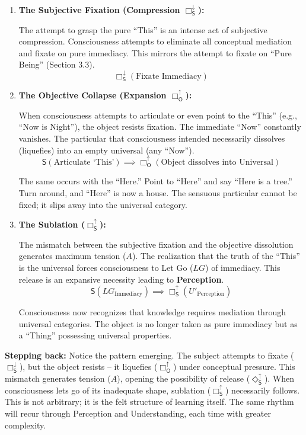 \documentclass[12pt]{book}
\newcommand{\SBoxUp}{\Box_{\mathsf{S}}^{\uparrow}}
\newcommand{\SBoxDown}{\Box_{\mathsf{S}}^{\downarrow}}
\newcommand{\OBoxUp}{\Box_{\mathsf{O}}^{\uparrow}}
\begin{document}
\begin{enumerate}
\item \textbf{The Subjective Fixation (Compression $\SBoxDown$):}

The attempt to grasp the pure ``This'' is an intense act of subjective compression. Consciousness attempts to eliminate all conceptual mediation and fixate on pure immediacy. This mirrors the attempt to fixate on ``Pure Being'' (Section 3.3).
\[
\SBoxDown(\text{Fixate Immediacy})
\]

\item \textbf{The Objective Collapse (Expansion $\OBoxUp$):}

When consciousness attempts to articulate or even point to the ``This'' (e.g., ``Now is Night''), the object resists fixation. The immediate ``Now'' constantly vanishes. The particular that consciousness intended necessarily dissolves (liquefies) into an empty universal (any ``Now'').
\[
\mathsf{S}(\text{Articulate `This'}) \implies \OBoxUp(\text{Object dissolves into Universal})
\]

The same occurs with the ``Here.'' Point to ``Here'' and say ``Here is a tree.'' Turn around, and ``Here'' is now a house. The sensuous particular cannot be fixed; it slips away into the universal category.

\item \textbf{The Sublation ($\SBoxUp$):}

The mismatch between the subjective fixation and the objective dissolution generates maximum tension ($A$). The realization that the truth of the ``This'' is the universal forces consciousness to Let Go ($LG$) of immediacy. This release is an expansive necessity leading to \textbf{Perception}.
\[
\mathsf{S}(LG_{\text{Immediacy}}) \implies \SBoxUp(U'_{\text{Perception}})
\]

Consciousness now recognizes that knowledge requires mediation through universal categories. The object is no longer taken as pure immediacy but as a ``Thing'' possessing universal properties.
\end{enumerate}

\textbf{Stepping back:} Notice the pattern emerging. The subject attempts to fixate ($\Box_{\mathsf{S}}^{\downarrow}$), but the object resists -- it liquefies ($\Box_{\mathsf{O}}^{\uparrow}$) under conceptual pressure. This mismatch generates tension ($A$), opening the possibility of release ($\Diamond_{\mathsf{S}}^{\uparrow}$). When consciousness lets go of its inadequate shape, sublation ($\Box_{\mathsf{S}}^{\uparrow}$) necessarily follows. This is not arbitrary; it is the felt structure of learning itself. The same rhythm will recur through Perception and Understanding, each time with greater complexity.
\end{document}
